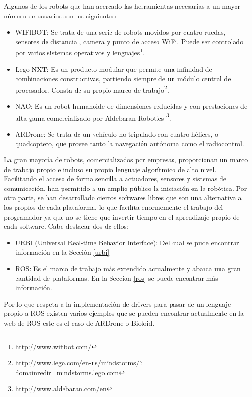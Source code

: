 \documentclass[12pt,a4paper,final,twoside]{book}
\begin{document}
Algunos de los robots que han acercado las herramientas necesarias a un mayor número de usuarios son los siguientes: 

\begin{itemize}
\item WIFIBOT: Se trata de una serie de robots movidos por cuatro ruedas, sensores de distancia , camera y punto de acceso WiFi. Puede ser controlado por varios sistemas operativos y lenguajes\footnote{\url{http://www.wifibot.com/}}.
\item Lego NXT: Es un producto modular que permite una infinidad de combinaciones constructivas, partiendo siempre de un módulo central de procesador. Consta de su propio marco de trabajo\footnote{\url{http://www.lego.com/en-us/mindstorms/?domainredir=mindstorms.lego.com}}.
\item NAO: Es un robot humanoide de dimensiones reducidas y con prestaciones de alta gama comercializado por Aldebaran Robotics \footnote{\url{http://www.aldebaran.com/en}}.
\item ARDrone: Se trata de un vehículo no tripulado con cuatro hélices, o quadcoptero,  que provee tanto la navegación autónoma como el radiocontrol.
\end{itemize}


La gran mayoría de robots, comercializados por empresas, proporcionan un marco de trabajo propio e incluso su propio lenguaje algorítmico de alto nivel. Facilitando el acceso de forma sencilla a actuadores, sensores y sistemas de comunicación, han permitido a un amplio público la iniciación en la robótica.
Por otra parte, se han desarrollado ciertos softwares libres que  son una alternativa a los propios de cada plataforma, lo que facilita enormemente el trabajo del programador ya que no se tiene que invertir tiempo en el aprendizaje propio de cada software. 
Cabe destacar dos de ellos:

\begin{itemize}
\item URBI  (Universal Real-time Behavior Interface)\cite{urbiref}: Del cual se pude encontrar información en la Sección \ref{urbi}.
\item ROS: Es el marco de trabajo más extendido actualmente y abarca una gran cantidad de plataformas. En la Sección \ref{ros} se puede encontrar más información.
\end{itemize} 

Por lo que respeta a la implementación de drivers para pasar de un lenguaje propio a ROS existen varios ejemplos que se pueden encontrar actualmente en la web de ROS este es el caso de ARDrone o Bioloid. 
\end{document}
